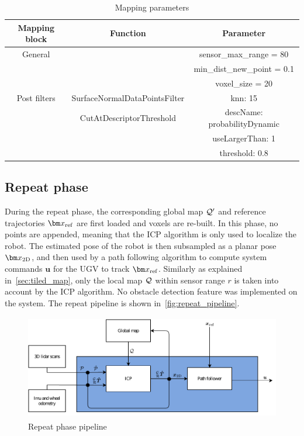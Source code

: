 \begin{table}[htpb]
	\caption{Mapping parameters}
	\begin{center}
		\begin{tabular}{c c c} \toprule
			Mapping block & Function                      & Parameter                    \\
			\midrule
			General       &                               & sensor\_max\_range = 80      \\
			              &                               & min\_dist\_new\_point = 0.1  \\
			              &                               & voxel\_size = 20             \\
			\midrule
			Post filters  & SurfaceNormalDataPointsFilter & knn: 15                      \\
			              & CutAtDescriptorThreshold      & descName: probabilityDynamic \\
			              &                               & useLargerThan: 1             \\
			              &                               & threshold: 0.8               \\
			\bottomrule
		\end{tabular}
	\end{center}
	\label{tab:mapping_params}
\end{table}

\subsection{Repeat phase}
\label{sec:repeat_phase}

During the repeat phase, the corresponding global map $\mathcal{Q}'$ and reference trajectories $\reftraj$ are first loaded and voxels are re-built.
In this phase, no points are appended, meaning that the \ac{ICP} algorithm is only used to localize the robot.
The estimated pose of the robot \transform{\robotf}{\mapf} is then subsampled as a planar pose $\poseplane$, and then used by a path following algorithm to compute system commands $\bm u$ for the \ac{UGV} to track $\reftraj$.
Similarly as explained in~\autoref{sec:tiled_map}, only the local map $\mathcal{Q}$ within sensor range $r$ is taken into account by the \ac{ICP} algorithm.
No obstacle detection feature was implemented on the system.
The repeat pipeline is shown in~\autoref{fig:repeat_pipeline}.

\begin{figure} [htpb]
	\centering
	\includegraphics[height=1.8in]{figs/repeat_pipeline/repeat_pipeline.pdf}
	\caption{Repeat phase pipeline}
	\label{fig:repeat_pipeline}
\end{figure}

